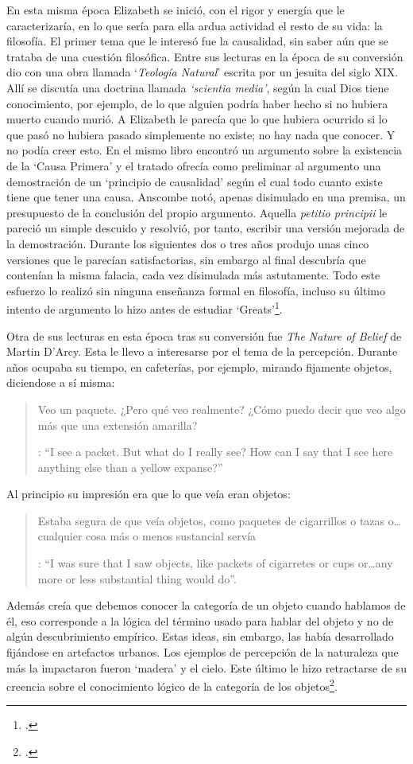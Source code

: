 En esta misma época Elizabeth se inició, con el rigor y energía que le caracterizaría, en lo que sería para ella ardua actividad el resto de su vida: la filosofía. El primer tema que le interesó fue la causalidad, sin saber aún que se trataba de una cuestión filosófica. Entre sus lecturas en la época de su conversión dio con una obra llamada `\emph{Teología Natural}' escrita por un jesuita del siglo XIX. Allí se discutía una doctrina llamada \emph{`scientia media'}, según la cual Dios tiene conocimiento, por ejemplo, de lo que alguien podría haber hecho si no hubiera muerto cuando murió. A Elizabeth le parecía que lo que hubiera ocurrido si lo que pasó no hubiera pasado simplemente no existe; no hay nada que conocer. Y no podía creer esto. En el mismo libro encontró un argumento sobre la existencia de la `Causa Primera' y el tratado ofrecía como preliminar al argumento una demostración de un `principio de causalidad' según el cual todo cuanto existe tiene que tener una causa. Anscombe notó, apenas disimulado en una premisa, un presupuesto de la conclusión del propio argumento. Aquella \emph{petitio principii} le pareció un simple descuido y resolvió, por tanto, escribir una versión mejorada de la demostración. Durante los siguientes dos o tres años produjo unas cinco versiones que le parecían satisfactorias, sin embargo al final descubría que contenían la misma falacia, cada vez disimulada más astutamente. Todo este esfuerzo lo realizó sin ninguna enseñanza formal en filosofía, incluso su último intento de argumento lo hizo antes de estudiar `Greats'\footcite[Cf.][Introduction, vii]{anscombe1981metaphysics}.

Otra de sus lecturas en esta época tras su conversión fue \emph{The Nature of Belief} de Martin D'Arcy. Esta le llevo a interesarse por el tema de la percepción. Durante años ocupaba su tiempo, en cafeterías, por ejemplo, mirando fijamente objetos, diciendose a sí misma: \blockquote[{\Cite[Introduction, viii]{anscombe1981metaphysics}}: \enquote{I see a packet. But what do I really see? How can I say that I see here anything else than a yellow expanse?}]{Veo un paquete. ¿Pero qué veo realmente? ¿Cómo puedo decir que veo algo más que una extensión amarilla?} Al principio su impresión era que lo que veía eran objetos: \blockquote[{\Cite[Introduction, viii]{anscombe1981metaphysics}}: \enquote{I was sure that I saw objects, like packets of cigarretes or cups or\ldots any more or less substantial thing would do}.]{Estaba segura de que veía objetos, como paquetes de cigarrillos o tazas o\ldots cualquier cosa más o menos sustancial servía}. Además creía que debemos conocer la categoría de un objeto cuando hablamos de él, eso corresponde a la lógica del término usado para hablar del objeto y no de algún descubrimiento empírico. Estas ideas, sin embargo, las había desarrollado fijándose en artefactos urbanos. Los ejemplos de percepción de la naturaleza que más la impactaron fueron `madera' y el cielo. Este último le hizo retractarse de su creencia sobre el conocimiento lógico de la categoría de los objetos\footcite[Cf.][Introduction, viii]{anscombe1981metaphysics}.

